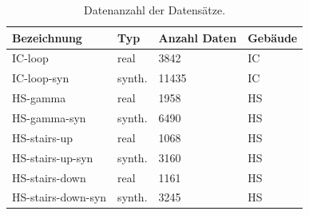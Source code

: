 \begin{table}[H]
	\centering
	\caption{Datenanzahl der Datensätze.}
	\begin{tabularx}{1.0\textwidth}{p{3.5cm} p{1.8cm} X  >{\centering\arraybackslash}p{1.7cm} }
		\textbf{Bezeichnung} & \textbf{Typ} & \textbf{Anzahl Daten} & \textbf{Gebäude}\\
		\hline
		IC-loop & real & 3842 & IC\\
		\hline
		IC-loop-syn & synth. & 11435 & IC\\
		\hline
		HS-gamma & real & 1958 & HS\\
		\hline
		HS-gamma-syn & synth. &  6490 & HS\\
		\hline
		HS-stairs-up & real & 1068 & HS\\
		\hline
		HS-stairs-up-syn & synth. & 3160 & HS\\
		\hline
		HS-stairs-down & real & 1161 & HS\\
		\hline
		HS-stairs-down-syn & synth. &  3245 & HS\\
	\end{tabularx}
	\label{tab:datasets}
\end{table}


\cleardoublepage

